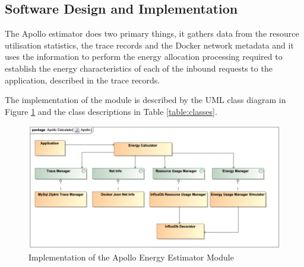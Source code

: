 \subsection{Software Design and Implementation}

The Apollo estimator does two primary things, it gathers data from the resource utilisation statistics, the trace records and the Docker network metadata and it uses the information to perform the energy allocation processing required to establish the energy characteristics of each of the inbound requests to the application, described in the trace records. 

The implementation of the module is described by the UML class diagram in Figure \ref{figure:classes} and the class descriptions in Table \ref{table:classes}.

\begin{figure}
\centering
\includegraphics[width=1.0\textwidth]{Figures/implementation-classes}
\caption{Implementation of the Apollo Energy Estimator Module}
\label{figure:classes}
\end{figure}

